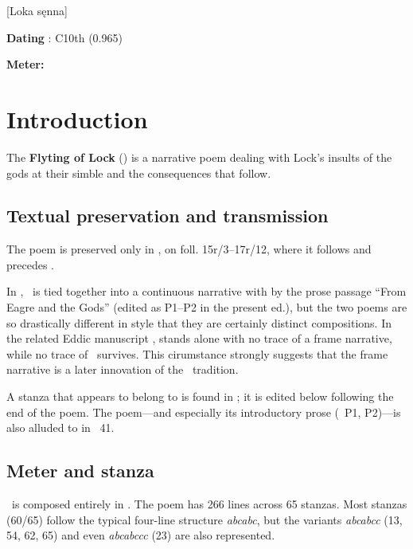 [Loka sęnna]

\begin{flushright}%
\textbf{Dating} \parencite{Sapp2022}: C10th (0.965)

\textbf{Meter:} \Ljodahattr%
\end{flushright}

\section{Introduction}

The \textbf{Flyting of Lock} (\Lokasenna) is a narrative poem dealing with Lock’s insults of the gods at their simble and the consequences that follow.

\subsection{Textual preservation and transmission}

The poem is preserved only in \Regius, on foll. 15r/3--17r/12, where it follows  and precedes .

In \Regius, \Lokasenna\ is tied together into a continuous narrative with  by the prose passage “From Eagre and the Gods” (edited as P1--P2 in the present ed.), but the two poems are so drastically different in style that they are certainly distinct compositions.
In the related Eddic manuscript \AM,  stands alone with no trace of a frame narrative, while no trace of \Lokasenna\ survives.  This cirumstance strongly suggests that the frame narrative is a later innovation of the \Regius\ tradition.

A stanza that appears to belong to  is found in \Gylfaginning; it is edited below following the end of the poem.  The poem---and especially its introductory prose (\Lokasenna\ P1, P2)---is also alluded to in \Skaldskaparmal\ 41.

\subsection{Meter and stanza}

\Lokasenna\ is composed entirely in \Ljodahattr.  The poem has 266 lines across 65 stanzas.  Most stanzas (60/65) follow the typical four-line structure \emph{abcabc}, but the variants \emph{abcabcc} (13, 54, 62, 65) and even \emph{abcabccc} (23) are also represented.

